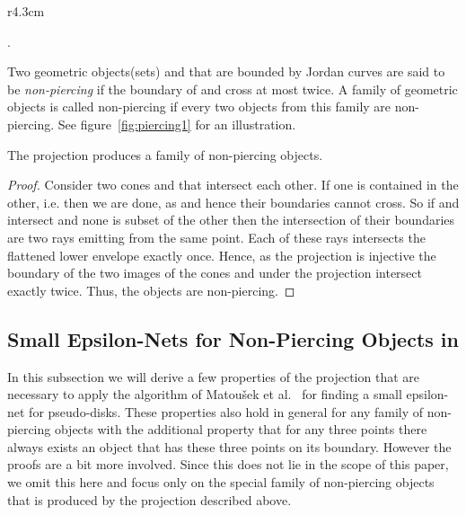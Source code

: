 \documentclass{stacs_proc}
\begin{document}
\vspace{-3ex}
\begin{wrapfigure}[11]{r}{4.3cm}
  \begin{center}
    \caption{A set of non-piercing objects}
    \label{fig:piercing1}
  \end{center}
\end{wrapfigure}
.
\begin{definition}
Two geometric objects(sets)  and  that are bounded
  by Jordan curves are said to be 
  \emph{non-piercing} 
  if 
the boundary of  and  cross at most twice.
  A family of geometric objects is called non-piercing if every
  two objects from this family are non-piercing. See
  figure~\ref{fig:piercing1} for an illustration. 
\end{definition}




 
\begin{lemma}
  \label{lem:piercing}
  The projection  produces a family  of non-piercing objects.
\end{lemma}

\begin{proof}
  Consider two cones  and  that intersect each other. If one
  is contained in the other, i.e.  then we are done, as
   and hence their boundaries cannot cross. So if
   and  intersect and none is subset of the other then the
  intersection of their boundaries are two rays emitting from the same
  point. Each of these rays intersects the flattened lower envelope
  exactly once. Hence, as the projection  is injective the boundary
  of the two images of the cones  and  under the projection
   intersect exactly twice. Thus, the objects are non-piercing.   
\end{proof}


\subsection{Small Epsilon-Nets for Non-Piercing Objects in }

In this subsection we will derive a few properties of the projection
that are necessary to apply the algorithm of Matou\v{s}ek et
al.~\cite{MSW90} for finding a small epsilon-net for
pseudo-disks. These properties also hold in general for any family of
non-piercing objects with the additional property that for any three
points there always exists an object that has these three points on
its boundary. 
However the proofs are a bit more involved. 
Since this does not lie in the scope of
this paper, we omit this here and focus only on the special family of
non-piercing objects that is produced by the projection described
above. 
\end{document}
